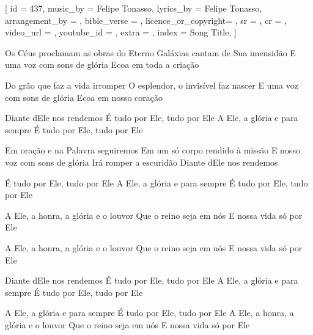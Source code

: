 [
    id                  = {437},
    music_by            = {Felipe Tonasso}, %
    lyrics_by           = {Felipe Tonasso}, %
    arrangement_by      = {}, %
    bible_verse         = {},
    licence_or_copyright= {},
    sr                  = {},
    cr                  = {},
    video_url           = {}, %
    youtube_id          = {}, %
    extra               = {},
    index               = {Song Title},
]

\beginverse
Os Céus proclamam as obras do Eterno
Galáxias cantam de Sua imensidão
E uma voz com sons de glória
Ecoa em toda a criação
\endverse

\beginverse
Do grão que faz a vida irromper
O esplendor, o invisível faz nascer
E uma voz com sons de glória
Ecoa em nosso coração
\endverse

\beginverse
Diante dEle nos rendemos
É tudo por Ele, tudo por Ele
A Ele, a glória e para sempre
É tudo por Ele, tudo por Ele
\endverse

\beginverse
Em oração e na Palavra seguiremos
Em um só corpo rendido à missão
E nosso voz com sons de glória
Irá romper a escuridão
Diante dEle nos rendemos
\endverse

\beginverse
É tudo por Ele, tudo por Ele
A Ele, a glória e para sempre
É tudo por Ele, tudo por Ele
\endverse

\beginverse
A Ele, a honra, a glória e o louvor
Que o reino seja em nós
E nossa vida só por Ele

A Ele, a honra, a glória e o louvor
Que o reino seja em nós
E nossa vida só por Ele
\endverse

\beginverse
Diante dEle nos rendemos
É tudo por Ele, tudo por Ele
A Ele, a glória e para sempre
É tudo por Ele, tudo por Ele
\endverse

\beginverse
A Ele, a glória e para sempre
É tudo por Ele, tudo por Ele
A Ele, a honra, a glória e o louvor
Que o reino seja em nós
E nossa vida só por Ele
\endverse

\beginchorus

\endchorus

\endsong
